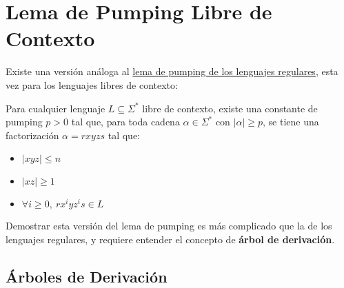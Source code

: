 \section{Lema de Pumping Libre de Contexto}

Existe una versión análoga al \hyperref[pumping-regulares]{lema de pumping de los lenguajes regulares}, esta vez para los lenguajes libres de contexto:

\begin{theorem*}
    Para cualquier lenguaje $L \subseteq \Sigma^*$ libre de contexto, existe una constante de pumping $p > 0$ tal que, para toda cadena $\alpha \in \Sigma^*$ con $|\alpha| \geq p$, se tiene una factorización $\alpha = r x y z s$ tal que:
    \begin{itemize}
        \item $|xyz| \leq n$
        \item $|xz| \geq 1$
        \item $\forall i \geq 0,\ r x^i y z^i s \in L$
    \end{itemize}
\end{theorem*}

Demostrar esta versión del lema de pumping es más complicado que la de los lenguajes regulares, y requiere entender el concepto de \textbf{árbol de derivación}.

\subsection{Árboles de Derivación}


